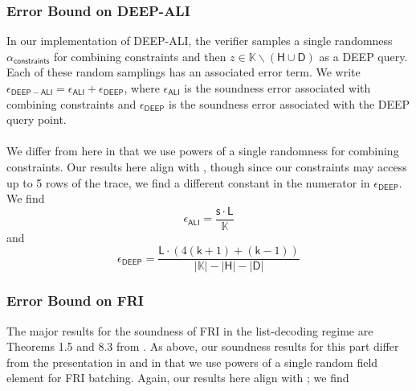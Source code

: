 \documentclass[10pt,letterpaper,titlepage]{article}
\theoremstyle{definition}
\begin{document}
\subsubsection{Error Bound on DEEP-ALI}
In our implementation of DEEP-ALI, the verifier samples a single randomness $\alpha_\mathsf{constraints}$ for combining constraints and then $z\in\mathbb{K}\backslash(\mathsf{H}\cup\mathsf{D})$ as a DEEP query. 
Each of these random samplings has an associated error term. 
We write $\epsilon_\mathsf{DEEP-ALI} = \epsilon_\mathsf{ALI} + \epsilon_\mathsf{DEEP}$, 
where $\epsilon_\mathsf{ALI}$ is the soundness error associated with combining constraints 
and $\epsilon_\mathsf{DEEP}$ is the soundness error associated with the DEEP query point. \\
\\
We differ from \cite{ethSTARK} here in that we use powers of a single randomness for combining constraints. 
Our results here align with \cite{FRIsummary}, though since our constraints may access up to 5 rows of the trace, we find a different constant in the numerator in $\epsilon_\mathsf{DEEP}$.
We find 
\[
  \epsilon_\mathsf{ALI} = 
  \frac{\mathsf{s}\cdot \mathsf{L}}{\mathbb{K}}
\] 
and 
\[
  \epsilon_\mathsf{DEEP} = 
  \frac{
    \mathsf{L}\cdot(4(\mathsf{k}+1)+(\mathsf{k}-1))}
    {|\mathbb{K}|-|\mathsf{H}|-|\mathsf{D}|}
\]
\subsubsection{Error Bound on FRI}
The major results for the soundness of FRI in the list-decoding regime are Theorems 1.5 and 8.3 from \cite{proxGaps}. 
As above, our soundness results for this part differ from the presentation in \cite{proxGaps} and \cite{ethSTARK} in that we use powers of a single random field element for FRI batching. 
Again, our results here align with \cite{FRIsummary}; we find 
\end{document}
